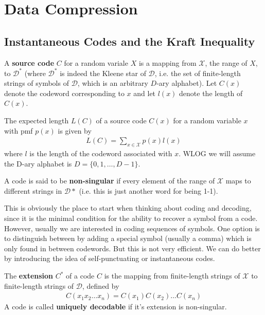 \section{Data Compression}
\subsection{Instantaneous Codes and the Kraft Inequality}
\begin{definition}
    A \textbf{source code} $C$ for a random variale $X$ is a mapping from $\mathcal{X}$, the range of $X$, to $\mathcal{D}^*$ (where $\mathcal{D}^*$ is indeed the Kleene star of $\mathcal{D}$, i.e. the set of finite-length strings of symbols of $\mathcal{D}$, which is an arbitrary $D$-ary alphabet). Let $C(x)$ denote the codeword corresponding to $x$ and let $l(x)$ denote the length of $C(x)$. 
\end{definition}
\begin{definition}
	The expected length $L(C)$ of a source code $C(x)$ for a random variable $x$ with pmf $p(x)$ is given by 
	\begin{align}
		L(C) = \sum_{x \in \mathcal{X}} p(x)l(x)
	\end{align}
where $l$ is the length of the codeword associated with $x$. WLOG we will assume the D-ary alphabet is $D = \{0,1,\ldots,D-1\}$. 
\end{definition}
\begin{definition}
	A code is said to be \textbf{non-singular} if every element of the range of $\mathcal{X}$ maps to different strings in $\mathcal{D}*$ (i.e. this is just another word for being 1-1).
\end{definition}
This is obviously the place to start when thinking about coding and decoding, since it is the minimal condition for the ability to recover a symbol from a code. However, usually we are interested in coding sequences of symbols. One option is to distinguish between by adding a special symbol (usually a comma) which is only found in between codewords. But this is not very efficient. We can do better by introducing the idea of self-punctuating or instantaneous codes. 
\begin{definition}
	The \textbf{extension} $C^*$ of a code $C$ is the mapping from finite-length strings of $\mathcal{X}$ to finite-length strings of $\mathcal{D}$, defined by 
	\begin{align}
		C(x_1x_2\ldots x_n) = C(x_1)C(x_2)\ldots C(x_n)
	\end{align}
A code is called \textbf{uniquely decodable} if it's extension is non-singular.
\end{definition}

